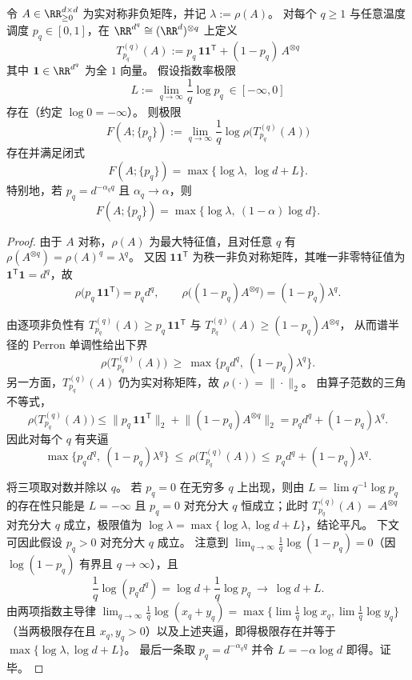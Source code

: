 \begin{theorem}\label{thm:pom-perron-landauer-limit-law}
令 \(A\in\RR_{\ge 0}^{d\times d}\) 为实对称非负矩阵，并记 \(\lambda:=\rho(A)\)。
对每个 \(q\ge 1\) 与任意温度调度 \(p_q\in[0,1]\)，在 \(\RR^{d^q}\cong(\RR^{d})^{\otimes q}\) 上定义
\begin{equation}\label{eq:pom-perron-landauer-tensor-soft-kernel}
\boxed{\;
T^{(q)}_{p_q}(A)
:=
p_q\,\mathbf 1\mathbf 1^{\mathsf T}+(1-p_q)\,A^{\otimes q}\;}
\end{equation}
其中 \(\mathbf 1\in\RR^{d^q}\) 为全 \(1\) 向量。
假设指数率极限
\[
L:=\lim_{q\to\infty}\frac{1}{q}\log p_q\ \in[-\infty,0]
\]
存在（约定 \(\log 0=-\infty\)）。
则极限
\[
F(A;\{p_q\})
:=\lim_{q\to\infty}\frac{1}{q}\log\rho\!\bigl(T^{(q)}_{p_q}(A)\bigr)
\]
存在并满足闭式
\[
F(A;\{p_q\})=\max\bigl\{\log\lambda,\ \log d + L\bigr\}.
\]
特别地，若 \(p_q=d^{-\alpha_q q}\) 且 \(\alpha_q\to\alpha\)，则
\[
F(A;\{p_q\})=\max\bigl\{\log\lambda,\ (1-\alpha)\log d\bigr\}.
\]
\end{theorem}
\begin{proof}
由于 \(A\) 对称，\(\rho(A)\) 为最大特征值，且对任意 \(q\) 有 \(\rho(A^{\otimes q})=\rho(A)^q=\lambda^q\)。
又因 \(\mathbf 1\mathbf 1^{\mathsf T}\) 为秩一非负对称矩阵，其唯一非零特征值为 \(\mathbf 1^{\mathsf T}\mathbf 1=d^q\)，故
\[
\rho\!\bigl(p_q\,\mathbf 1\mathbf 1^{\mathsf T}\bigr)=p_q d^q,
\qquad
\rho\!\bigl((1-p_q)A^{\otimes q}\bigr)=(1-p_q)\lambda^q.
\]

由逐项非负性有
\(
T^{(q)}_{p_q}(A)\ge p_q\,\mathbf 1\mathbf 1^{\mathsf T}
\)
与
\(
T^{(q)}_{p_q}(A)\ge (1-p_q)A^{\otimes q}
\)，
从而谱半径的 Perron 单调性给出下界
\[
\rho\!\bigl(T^{(q)}_{p_q}(A)\bigr)\ \ge\ \max\{p_q d^q,\ (1-p_q)\lambda^q\}.
\]
另一方面，\(T^{(q)}_{p_q}(A)\) 仍为实对称矩阵，故 \(\rho(\cdot)=\|\cdot\|_2\)。
由算子范数的三角不等式，
\[
\rho\!\bigl(T^{(q)}_{p_q}(A)\bigr)
\le
\bigl\|p_q\,\mathbf 1\mathbf 1^{\mathsf T}\bigr\|_2+\bigl\|(1-p_q)A^{\otimes q}\bigr\|_2
=p_q d^q+(1-p_q)\lambda^q.
\]
因此对每个 \(q\) 有夹逼
\[
\max\{p_q d^q,\ (1-p_q)\lambda^q\}
\ \le\
\rho\!\bigl(T^{(q)}_{p_q}(A)\bigr)
\ \le\
p_q d^q+(1-p_q)\lambda^q.
\]

将三项取对数并除以 \(q\)。
若 \(p_q=0\) 在无穷多 \(q\) 上出现，则由 \(L=\lim q^{-1}\log p_q\) 的存在性只能是 \(L=-\infty\) 且 \(p_q=0\) 对充分大 \(q\) 恒成立；此时 \(T^{(q)}_{p_q}(A)=A^{\otimes q}\) 对充分大 \(q\) 成立，极限值为 \(\log\lambda=\max\{\log\lambda,\log d+L\}\)，结论平凡。
下文可因此假设 \(p_q>0\) 对充分大 \(q\) 成立。
注意到 \(\lim_{q\to\infty}\frac1q\log(1-p_q)=0\)（因 \(\log(1-p_q)\) 有界且 \(q\to\infty\)），且
\[
\frac1q\log(p_q d^q)=\log d+\frac1q\log p_q\ \to\ \log d+L.
\]
由两项指数主导律
\(
\lim_{q\to\infty}\frac1q\log(x_q+y_q)=\max\{\lim\frac1q\log x_q,\lim\frac1q\log y_q\}
\)
（当两极限存在且 \(x_q,y_q>0\)）以及上述夹逼，即得极限存在并等于 \(\max\{\log\lambda,\log d+L\}\)。
最后一条取 \(p_q=d^{-\alpha_q q}\) 并令 \(L=-\alpha\log d\) 即得。证毕。
\end{proof}
